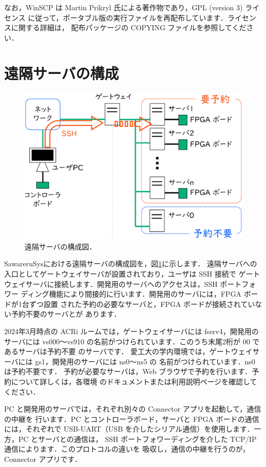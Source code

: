 なお，WinSCP は Martin Prikryl 氏による著作物であり，GPL (version 3) ライセンス
に従って，ポータブル版の実行ファイルを再配布しています．ライセンスに関する詳細は，
配布パッケージの COPYING ファイルを参照してください．

\section{遠隔サーバの構成}

\begin{figure}[ht]
 \centering
 \includegraphics[width=80truemm]{figs/servers.pdf}
 \caption{遠隔サーバの構成図．}
 \label{fig:servers}
\end{figure}

SawareruSysにおける遠隔サーバの構成図を，図\ref{fig:servers}に示します．
遠隔サーバへの入口としてゲートウェイサーバが設置されており，ユーザは SSH 接続で
ゲートウェイサーバに接続します．開発用のサーバへのアクセスは，SSH ポートフォワー
ディング機能により間接的に行います．開発用のサーバには，FPGA ボードが1台ずつ設置
された予約の必要なサーバと，FPGA ボードが接続されていない予約不要のサーバとが
あります．

2024年3月時点の ACRi ルームでは，ゲートウェイサーバには fserv4，開発用のサーバには
vs000～vs910 の名前がつけられています．このうち末尾2桁が 00 であるサーバは予約不要
のサーバです．
愛工大の学内環境では，ゲートウェイサーバには gs1，開発用のサーバには ns0～ns5 の
名前がつけられています．ns0 は予約不要です．
予約が必要なサーバは，Web ブラウザで予約を行います．予約について詳しくは，各環境
のドキュメントまたは利用説明ページを確認してください．

PC と開発用のサーバでは，それぞれ別々の Connector アプリを起動して，通信の中継を
行います．PC とコントローラボード，サーバと FPGA ボードの通信には，それぞれで
USB-UART（USB を介したシリアル通信）を使用します．一方，PC とサーバとの通信は，
SSH ポートフォワーディングを介した TCP/IP 通信によります．このプロトコルの違いを
吸収し，通信の中継を行うのが，Connector アプリです．


